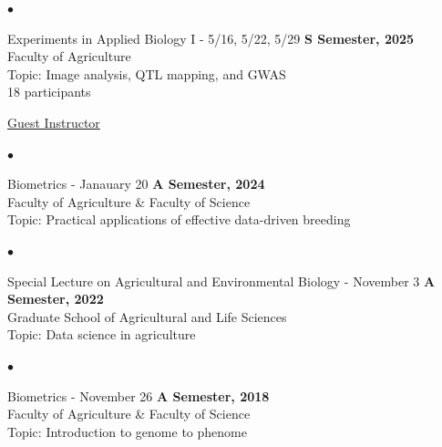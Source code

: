 \documentclass[margin,line,10pt]{res}
\newenvironment{list2}{
  \begin{list}{$\bullet$}{%
      \setlength{\itemsep}{0in}
      \setlength{\parsep}{0in} \setlength{\parskip}{0in}
      \setlength{\topsep}{0in} \setlength{\partopsep}{0in} 
      \setlength{\leftmargin}{0.2in}}}{\end{list}}
\begin{document}
\begin{resume}
\vspace{0.4cm}

\begin{list2}
  \item Experiments in Applied Biology I - 5/16, 5/22, 5/29 \hfill {\bf S Semester, 2025} \\ %
  Faculty of Agriculture \\ %
  Topic: Image analysis, QTL mapping, and GWAS \\
  18  participants 
\end{list2}










\vspace{0.4cm}
\underline{Guest Instructor}
\vspace{0.4cm}
 \begin{list2}
 \item Biometrics - Janauary 20 \hfill {\bf A Semester, 2024} \\
 Faculty of Agriculture \& Faculty of Science \\ %
 Topic: Practical applications of effective data-driven breeding %
\end{list2}


\vspace{0.4cm}
 \begin{list2}
 \item Special Lecture on Agricultural and Environmental Biology - November 3  \hfill {\bf A Semester, 2022} \\
 Graduate School of Agricultural and Life Sciences \\ 
 Topic: Data science in agriculture
\end{list2}


\vspace{0.4cm}
 \begin{list2}
 \item Biometrics  - November 26 \hfill {\bf A Semester, 2018} \\
 Faculty of Agriculture \& Faculty of Science \\
 Topic: Introduction to genome to phenome
 \end{list2}


 \vspace{1cm}




\end{resume}
\end{document}
